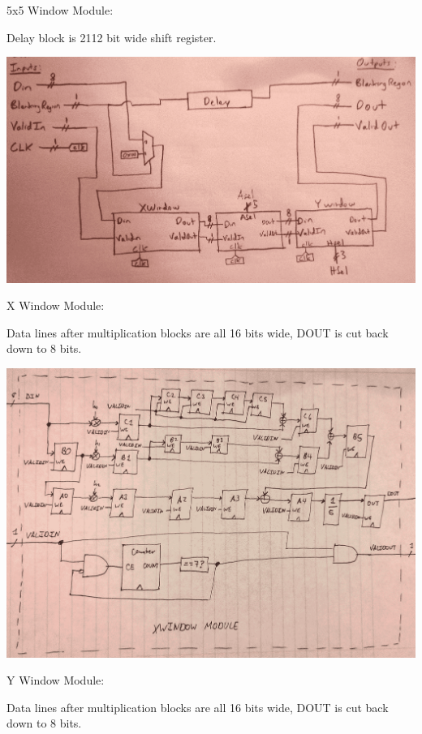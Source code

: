 \documentclass[11pt]{article}
\begin{document}
\newpage

5x5 Window Module:

Delay block is 2112 bit wide shift register.

\noindent\includegraphics[width=\textwidth]{modules/proc5x5window.png}

\newpage
X Window Module:

Data lines after multiplication blocks are all 16 bits wide, DOUT is cut
back down to 8 bits.

\noindent\includegraphics[width=\textwidth]{modules/procx_window.png}

\newpage 

Y Window Module:

Data lines after multiplication blocks are all 16 bits wide, DOUT is cut
back down to 8 bits.
\end{document}
